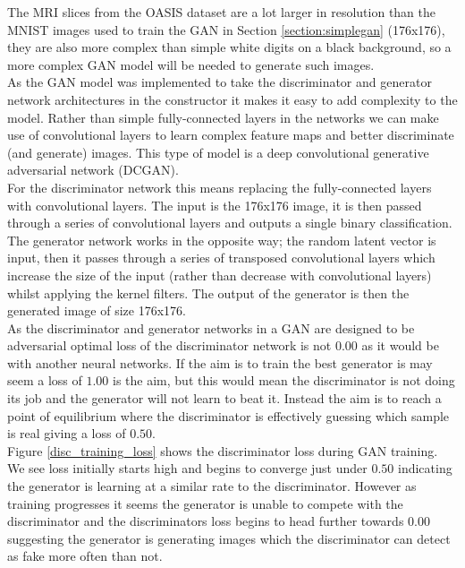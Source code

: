\documentclass[
    author={Kai Hulme},
    supervisor={Dr Jon Bird},
    degree={BSc},
    title={Generative Adversarial Networks as an Augmentation Technique},
    subtitle={for Alzheimer's Disease Detection in MRI Volumes},
    type={Research},
    year={2021} 
]{dissertation}
\begin{document}
The MRI slices from the OASIS dataset are a lot larger in resolution than the MNIST images used to train the GAN in Section \ref{section:simplegan} (176x176), they are also more complex than simple white digits on a black background, so a more complex GAN model will be needed to generate such images. \\

As the GAN model was implemented to take the discriminator and generator network architectures in the constructor it makes it easy to add complexity to the model. Rather than simple fully-connected layers in the networks we can make use of convolutional layers to learn complex feature maps and better discriminate (and generate) images. This type of model is a deep convolutional generative adversarial network (DCGAN). \\

For the discriminator network this means replacing the fully-connected layers with convolutional layers. The input is the 176x176 image, it is then passed through a series of convolutional layers and outputs a single binary classification. The generator network works in the opposite way; the random latent vector is input, then it passes through a series of transposed convolutional layers which increase the size of the input (rather than decrease with convolutional layers) whilst applying the kernel filters. The output of the generator is then the generated image of size 176x176. \\

As the discriminator and generator networks in a GAN are designed to be adversarial optimal loss of the discriminator network is not $0.00$ as it would be with another neural networks. If the aim is to train the best generator is may seem a loss of $1.00$ is the aim, but this would mean the discriminator is not doing its job and the generator will not learn to beat it. Instead the aim is to reach a point of equilibrium where the discriminator is effectively guessing which sample is real giving a loss of $0.50$. \\

Figure \ref{disc_training_loss} shows the discriminator loss during GAN training. We see loss initially starts high and begins to converge just under $0.50$ indicating the generator is learning at a similar rate to the discriminator. However as training progresses it seems the generator is unable to compete with the discriminator and the discriminators loss begins to head further towards $0.00$ suggesting the generator is generating images which the discriminator can detect as fake more often than not. \\
\end{document}
